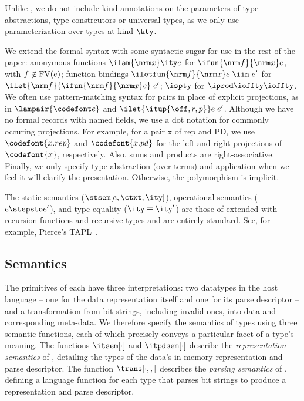 Unlike \fomega, we do not include kind annotations on the parameters
of type abstractions, type constrcutors or universal types, as we only
use parameterization over types at kind $\kty$.

We extend the formal syntax with some syntactic sugar 
for use in the rest of the paper: anonymous functions
$\ilam {\nrm x} \ity e$ for $\ifun {\nrm f} {\nrm x} e$, with $f
\not\in {\rm FV}(e)$; function bindings $\iletfun {\nrm f} {\nrm x} e
\; \iin \; e'$ for $\ilet {\nrm f} {\ifun {\nrm f} {\nrm x} e} \; e'$;
$\ispty$ for $\iprod \ioffty \ioffty$.  We often use
pattern-matching syntax for pairs in place of explicit projections, as
in $\lampair{\codefont e}$ and $\ilet {\itup{\off,r,p}} e\; e'$.  Although
we have no formal records with named fields, we use a dot notation for
commonly occuring projections. For example, for a pair $\mathtt x$ of
rep and PD, we use $\codefont{x.rep}$ and $\codefont{x.pd}$ for the
left and right projections of $\codefont{x}$, respectively. Also, sums and products are
right-associative.  Finally, we only specify type abstraction (over
terms) and application when we feel it will clarify the
presentation. Otherwise, the polymorphism is implicit.

The static semantics ($\stsem[e,{\ctxt},\ity]$), operational
semantics ($e \stepsto e'$), and type equality ($\ity \equiv \ity'$) are those of \fomega extended with
recursion functions and recursive types and are entirely standard.
See, for example, Pierce's TAPL~\cite{pierce:tapl}.

\subsection{\ddc{} Semantics}
\label{sec:ddc-sem}

The primitives of \ddc{} each have three interpretations: two
datatypes in the host language -- one for the data representation
itself and one for its parse descriptor -- and a transformation from
bit strings, including invalid ones, into data and corresponding
meta-data.  We therefore specify the semantics of \ddc{} types using three semantic
functions, each of which precisely conveys a particular facet of a
type's meaning.  The functions $\itsem[\cdot]$ and $\itpdsem[\cdot]$
describe the {\it representation semantics} of \ddc{}, detailing the
types of the data's in-memory representation and parse descriptor. The
function $\trans[\cdot,,]$ describes the {\it parsing semantics} of
\ddc{}, defining a \implang{} language function for each type that
parses bit strings to produce a representation and parse descriptor.

